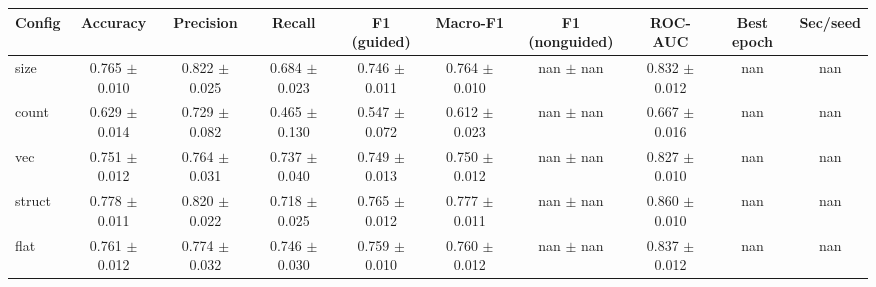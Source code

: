 \begin{tabular}{lccccccccc}
\hline
Config & Accuracy & Precision & Recall & F1 (guided) & Macro-F1 & F1 (nonguided) & ROC-AUC & Best epoch & Sec/seed \\
\hline
size & 0.765 $\pm$ 0.010 & 0.822 $\pm$ 0.025 & 0.684 $\pm$ 0.023 & 0.746 $\pm$ 0.011 & 0.764 $\pm$ 0.010 & nan $\pm$ nan & 0.832 $\pm$ 0.012 & nan & nan \\
count & 0.629 $\pm$ 0.014 & 0.729 $\pm$ 0.082 & 0.465 $\pm$ 0.130 & 0.547 $\pm$ 0.072 & 0.612 $\pm$ 0.023 & nan $\pm$ nan & 0.667 $\pm$ 0.016 & nan & nan \\
vec & 0.751 $\pm$ 0.012 & 0.764 $\pm$ 0.031 & 0.737 $\pm$ 0.040 & 0.749 $\pm$ 0.013 & 0.750 $\pm$ 0.012 & nan $\pm$ nan & 0.827 $\pm$ 0.010 & nan & nan \\
struct & 0.778 $\pm$ 0.011 & 0.820 $\pm$ 0.022 & 0.718 $\pm$ 0.025 & 0.765 $\pm$ 0.012 & 0.777 $\pm$ 0.011 & nan $\pm$ nan & 0.860 $\pm$ 0.010 & nan & nan \\
flat & 0.761 $\pm$ 0.012 & 0.774 $\pm$ 0.032 & 0.746 $\pm$ 0.030 & 0.759 $\pm$ 0.010 & 0.760 $\pm$ 0.012 & nan $\pm$ nan & 0.837 $\pm$ 0.012 & nan & nan \\
\hline
\end{tabular}
